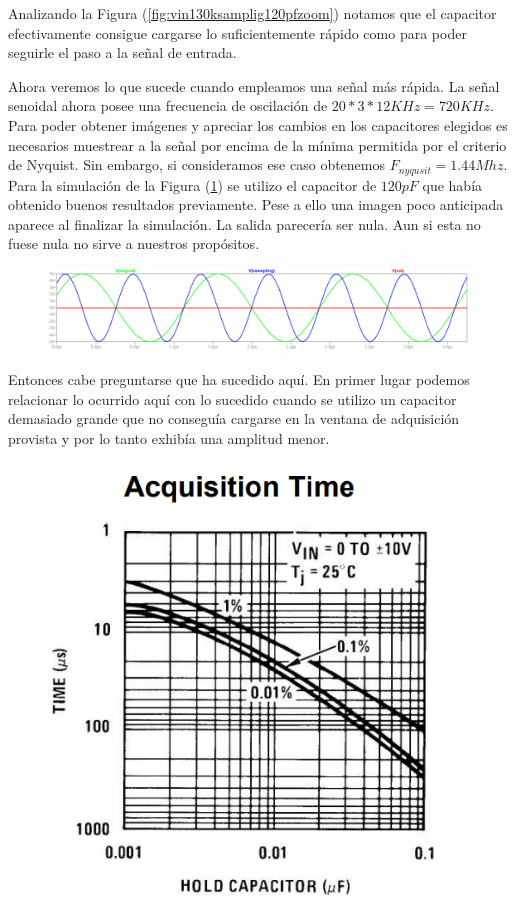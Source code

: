 Analizando la Figura (\ref{fig:vin130ksamplig120pfzoom}) notamos que el capacitor efectivamente consigue cargarse lo suficientemente rápido como para poder seguirle el paso a la señal de entrada. 


Ahora veremos lo que sucede cuando empleamos una señal más rápida.
La señal senoidal ahora posee una frecuencia de oscilación de $20*3*12 KHz = 720KHz$. Para poder obtener imágenes y apreciar los cambios en los capacitores elegidos es necesarios muestrear a la señal por encima de la mínima permitida por el criterio de Nyquist. Sin embargo, si consideramos ese caso obtenemos  $F_{nyqusit}=1.44Mhz$.
Para la simulación de la Figura (\ref{fig:vin21440ksamplign120pf}) se utilizo el capacitor de $120pF$ que había obtenido buenos resultados previamente. Pese a ello una imagen poco anticipada aparece al finalizar la simulación. La salida parecería ser nula. Aun si esta no fuese nula no sirve a nuestros propósitos. 
\begin{figure}[H]
	\centering
	\includegraphics[width=\linewidth]{ImagenesEjercicio4/ChTests/Vin2_1440kSamplign120pF}
	\caption{}
	\label{fig:vin21440ksamplign120pf}
\end{figure}

Entonces cabe preguntarse que ha sucedido aquí. 
En primer lugar podemos relacionar lo ocurrido aquí con lo sucedido cuando se utilizo un capacitor demasiado grande que no conseguía cargarse en la ventana de adquisición provista y por lo tanto exhibía una amplitud menor.

\begin{figure}[H]
	\centering
	\includegraphics[scale=0.6]{ImagenesEjercicio4/HoldCapAcqTime}
	\caption{}
	\label{fig:holdcapacqtime}
\end{figure}

